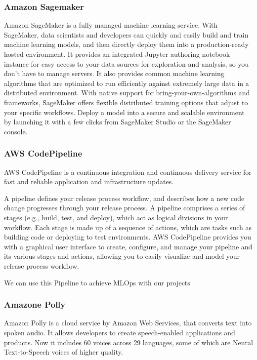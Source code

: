 \subsubsection{\textbf{Amazon Sagemaker}}
Amazon SageMaker is a fully managed machine learning service. With SageMaker, data scientists and developers can quickly and easily build and train machine learning models, and then directly deploy them into a production-ready hosted environment. It provides an integrated Jupyter authoring notebook instance for easy access to your data sources for exploration and analysis, so you don't have to manage servers. It also provides common machine learning algorithms that are optimized to run efficiently against extremely large data in a distributed environment. With native support for bring-your-own-algorithms and frameworks, SageMaker offers flexible distributed training options that adjust to your specific workflows. Deploy a model into a secure and scalable environment by launching it with a few clicks from SageMaker Studio or the SageMaker console. \\

\subsubsection{\textbf{AWS CodePipeline}}
AWS CodePipeline is a continuous integration and continuous delivery service for fast and reliable application and infrastructure updates.

A pipeline defines your release process workflow, and describes how a new code change progresses through your release process. A pipeline comprises a series of stages (e.g., build, test, and deploy), which act as logical divisions in your workflow. Each stage is made up of a sequence of actions, which are tasks such as building code or deploying to test environments. AWS CodePipeline provides you with a graphical user interface to create, configure, and manage your pipeline and its various stages and actions, allowing you to easily visualize and model your release process workflow.

We can use this Pipeline to achieve MLOps with our projects\\

\subsubsection{\textbf{Amazone Polly}}
Amazon Polly is a cloud service by Amazon Web Services, that converts text into spoken audio. It allows developers to create speech-enabled applications and products. Now it includes 60 voices across 29 languages, some of which are Neural Text-to-Speech voices of higher quality.


